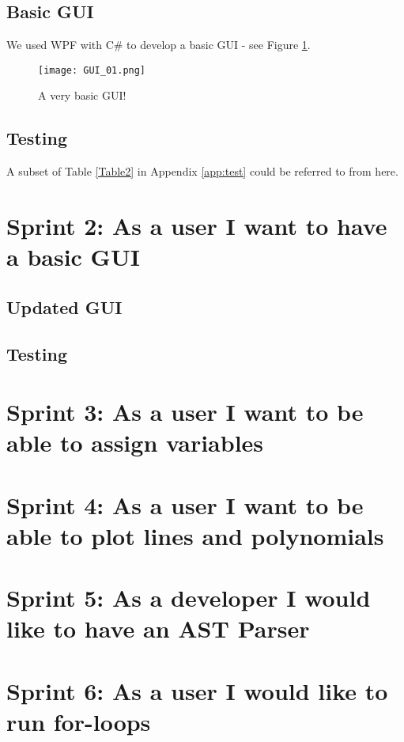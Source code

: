 \documentclass[a4paper, oneside, 11pt]{report}
\begin{document}
\subsection{Basic GUI}
We used WPF with C\# to develop a basic GUI - see Figure \ref{gui01}.

\begin{figure}[htb]
\begin{center}
\texttt{[image: GUI\_01.png]}
\caption{A very basic GUI!}
\label{gui01}
\end{center}
\end{figure}

\subsection{Testing}
A subset of Table \ref{Table2} in Appendix \ref{app:test} could be referred to from here.

\section{Sprint 2: As a user I want to have a basic GUI}

\subsection{Updated GUI}

\subsection{Testing}

\section{Sprint 3: As a user I want to be able to assign variables}
\section{Sprint 4: As a user I want to be able to plot lines and polynomials}
\section{Sprint 5: As a developer I would like to have an AST Parser}
\section{Sprint 6: As a user I would like to run for-loops}
\end{document}
